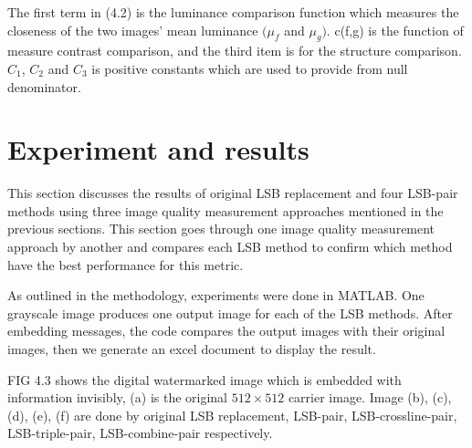 The first term in (4.2) is the luminance comparison function which measures the closeness of the two images’ mean luminance \((\mu_{f}\)  and \(\mu_{g})\). c(f,g) is the function of measure contrast comparison, and the third item is for the structure comparison. \(C_{1}\), \(C_{2}\) and \(C_{3}\) is positive constants which are used to provide from null denominator.


\section{\label{sec:level1}Experiment and results}

This section discusses the results of original LSB replacement and four LSB-pair methods using three image quality measurement approaches mentioned in the previous sections. This section goes through one image quality measurement approach by another and compares each LSB method to confirm which method have the best performance for this metric.  

As outlined in the methodology, experiments were done in MATLAB. One grayscale image produces one output image for each of the LSB methods. After embedding messages, the code compares the output images with their original images, then we generate an excel document to display the result.

FIG 4.3 shows the digital watermarked image which is embedded with information invisibly, (a) is the original $512 \times 512$ carrier image. Image (b), (c), (d), (e), (f) are done by original LSB replacement, LSB-pair, LSB-crossline-pair, LSB-triple-pair, LSB-combine-pair respectively. 





